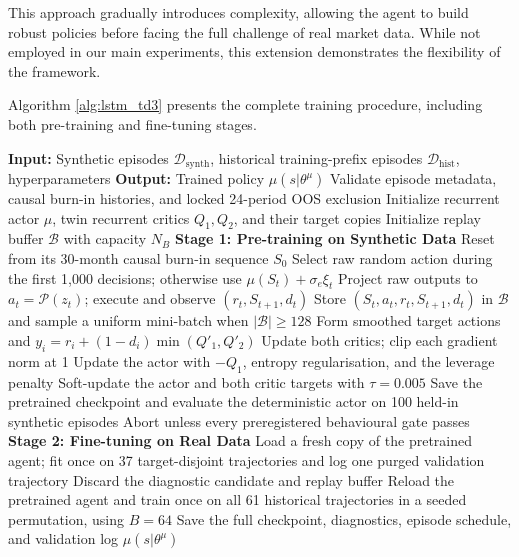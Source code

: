 This approach gradually introduces complexity, allowing the agent to build robust policies before facing the full challenge of real market data. While not employed in our main experiments, this extension demonstrates the flexibility of the framework.

Algorithm \ref{alg:lstm_td3} presents the complete training procedure, including both pre-training and fine-tuning stages.

\begin{algorithm}[H]
\caption{LSTM-TD3 Training Procedure}
\label{alg:lstm_td3}
\begin{algorithmic}[1]
\STATE \textbf{Input:} Synthetic episodes $\mathcal{D}_{\text{synth}}$, historical training-prefix episodes $\mathcal{D}_{\text{hist}}$, hyperparameters
\STATE \textbf{Output:} Trained policy $\mu(s|\theta^\mu)$
\STATE
\STATE Validate episode metadata, causal burn-in histories, and locked 24-period OOS exclusion
\STATE Initialize recurrent actor $\mu$, twin recurrent critics $Q_1,Q_2$, and their target copies
\STATE Initialize replay buffer $\mathcal{B}$ with capacity $N_B$
\STATE
\STATE \textbf{Stage 1: Pre-training on Synthetic Data}
    \STATE Reset from its 30-month causal burn-in sequence $S_0$
        \STATE Select raw random action during the first 1,000 decisions; otherwise use $\mu(S_t)+\sigma_e\xi_t$
        \STATE Project raw outputs to $a_t=\mathcal{P}(z_t)$; execute and observe $(r_t,S_{t+1},d_t)$
        \STATE Store $(S_t,a_t,r_t,S_{t+1},d_t)$ in $\mathcal{B}$ and sample a uniform mini-batch when $|\mathcal{B}|\geq128$
        \STATE Form smoothed target actions and $y_i=r_i+(1-d_i)\min(Q'_1,Q'_2)$
        \STATE Update both critics; clip each gradient norm at 1
            \STATE Update the actor with $-Q_1$, entropy regularisation, and the leverage penalty
            \STATE Soft-update the actor and both critic targets with $\tau=0.005$
        \ENDIF
    \ENDFOR
\ENDFOR
\STATE Save the pretrained checkpoint and evaluate the deterministic actor on 100 held-in synthetic episodes
\STATE Abort unless every preregistered behavioural gate passes
\STATE
\STATE \textbf{Stage 2: Fine-tuning on Real Data}
\STATE Load a fresh copy of the pretrained agent; fit once on 37 target-disjoint trajectories and log one purged validation trajectory
\STATE Discard the diagnostic candidate and replay buffer
\STATE Reload the pretrained agent and train once on all 61 historical trajectories in a seeded permutation, using $B=64$
\STATE Save the full checkpoint, diagnostics, episode schedule, and validation log
\RETURN $\mu(s|\theta^\mu)$
\end{algorithmic}
\end{algorithm}











